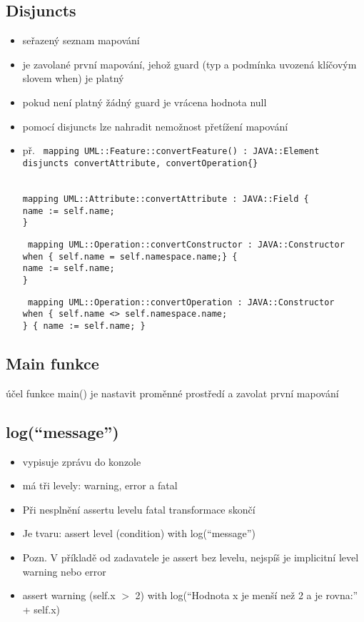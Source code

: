 \documentclass[11pt,a4paper]{article}   	%
\begin{document}
\subsection{Disjuncts}
	\begin {itemize}
	  \item 	seřazený seznam mapování
	  \item 	je zavolané první mapování, jehož guard (typ a podmínka uvozená
	  			klíčovým slovem when) je platný
	  \item 	pokud není platný žádný guard je vrácena hodnota null
	  \item 	pomocí disjuncts lze nahradit nemožnost přetížení mapování
	  \item 	př.	\texttt { 
	  					mapping UML::Feature::convertFeature() : JAVA::Element \\ disjuncts
	  					convertAttribute, convertOperation\{\}
					}

					\texttt{	
						\\mapping UML::Attribute::convertAttribute : JAVA::Field \{\\
						name := self.name;\\ \}
					}

					\texttt{	
						mapping UML::Operation::convertConstructor : JAVA::Constructor \\
						when \{ self.name = self.namespace.name;\} \{ \\name := self.name; \\ \}
					}


					\texttt{
						mapping UML::Operation::convertOperation : JAVA::Constructor \\ when \{
						self.name <> self.namespace.name;\\ \} \{ name := self.name; \}
					}
	\end{itemize}

\subsection {Main funkce}
účel funkce main() je nastavit proměnné prostředí a zavolat první mapování


\subsection{log(“message”)}
\begin{itemize}
	\item	vypisuje zprávu do konzole
	\item	má tři levely: warning, error a fatal
	\item	Při nesplnění assertu levelu fatal transformace skončí
	\item	Je tvaru: assert level (condition) with log(“message”)
	\item	Pozn. V příkladě od zadavatele je assert bez levelu, nejspíš je implicitní level warning nebo error
	\item 	assert warning (self.x $>$ 2) with log(“Hodnota x je menší než 2 a je
	rovna:” + self.x)
\end{itemize}
\end{document}
